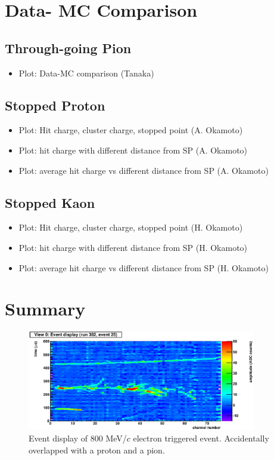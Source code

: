 \documentclass{cernyrep}
\begin{document}
\section{Data- MC Comparison}
\subsection{Through-going Pion}
\begin{itemize}
\item Plot: Data-MC comparison  (Tanaka)
\end{itemize}

\subsection{Stopped Proton}
\begin{itemize}
\item Plot: Hit charge, cluster charge, stopped point  (A. Okamoto)
\item Plot: hit charge with different distance from SP   (A. Okamoto)
\item Plot: average hit charge vs different distance from SP   (A. Okamoto)
\end{itemize}

\subsection{Stopped Kaon}
\begin{itemize}
\item Plot: Hit charge, cluster charge, stopped point   (H. Okamoto)
\item Plot: hit charge with different distance from SP    (H. Okamoto)
\item Plot: average hit charge vs different distance from SP    (H. Okamoto)
\end{itemize}

\section{Summary}
\clearpage

\begin{figure}[htbp]
 \begin{center}
  \includegraphics[width=100mm]{Textbook.eps}
 \end{center}
 \caption{Event display of 800 MeV/$c$ electron triggered event.
Accidentally overlapped with a proton and a pion.}
 \label{Fig:Textbook}
\end{figure}
\end{document}

